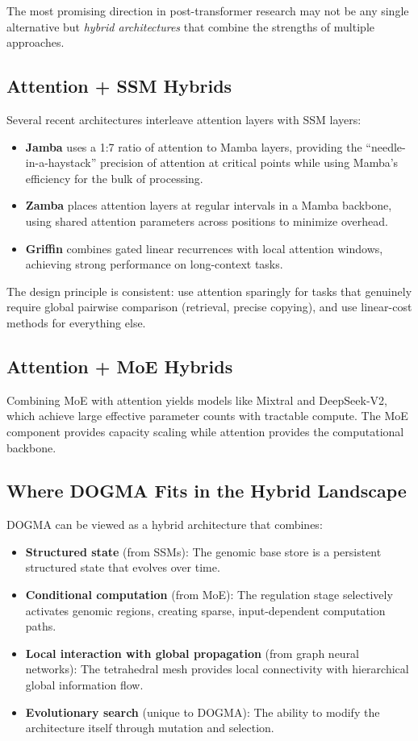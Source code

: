 The most promising direction in post-transformer research may not be any single alternative but \emph{hybrid architectures} that combine the strengths of multiple approaches.

\subsection{Attention + SSM Hybrids}

Several recent architectures interleave attention layers with SSM layers:
\begin{itemize}[leftmargin=1.8em]
  \item \textbf{Jamba} uses a 1:7 ratio of attention to Mamba layers, providing the ``needle-in-a-haystack'' precision of attention at critical points while using Mamba's efficiency for the bulk of processing.
  \item \textbf{Zamba} places attention layers at regular intervals in a Mamba backbone, using shared attention parameters across positions to minimize overhead.
  \item \textbf{Griffin} combines gated linear recurrences with local attention windows, achieving strong performance on long-context tasks.
\end{itemize}

The design principle is consistent: use attention sparingly for tasks that genuinely require global pairwise comparison (retrieval, precise copying), and use linear-cost methods for everything else.

\subsection{Attention + MoE Hybrids}

Combining MoE with attention yields models like Mixtral and DeepSeek-V2, which achieve large effective parameter counts with tractable compute. The MoE component provides capacity scaling while attention provides the computational backbone.

\subsection{Where DOGMA Fits in the Hybrid Landscape}

DOGMA can be viewed as a hybrid architecture that combines:
\begin{itemize}[leftmargin=1.8em]
  \item \textbf{Structured state} (from SSMs): The genomic base store is a persistent structured state that evolves over time.
  \item \textbf{Conditional computation} (from MoE): The regulation stage selectively activates genomic regions, creating sparse, input-dependent computation paths.
  \item \textbf{Local interaction with global propagation} (from graph neural networks): The tetrahedral mesh provides local connectivity with hierarchical global information flow.
  \item \textbf{Evolutionary search} (unique to DOGMA): The ability to modify the architecture itself through mutation and selection.
\end{itemize}

